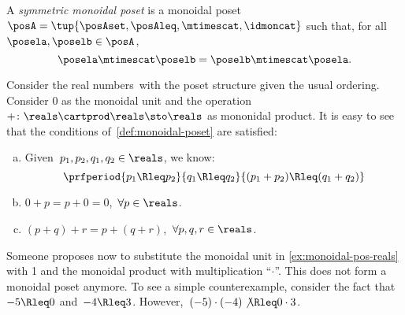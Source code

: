 \begin{ctdefinition}
    \label{def:sym-monoidal-poset}
    A \emph{symmetric monoidal poset} is a monoidal poset~$\posA=\tup{\posAset, \posAleq, \mtimescat, \idmoncat}$ such that, for all~$\posela, \poselb \in \posA$,
    \begin{equation}
        \posela \mtimescat \poselb = \poselb \mtimescat \posela.
    \end{equation}
\end{ctdefinition}

\begin{example}
    \label{ex:monoidal-pos-reals}
    Consider the real numbers~\reals with the poset structure given the usual ordering.
    Consider 0 as the monoidal unit and the operation~$+\colon \reals\cartprod \reals\sto \reals$ as mononidal product.
    It is easy to see that the conditions of~\cref{def:monoidal-poset} are satisfied:
    \begin{enumerate}[(a)]
        \item Given~$p_1,p_2,q_1,q_2\in \reals$, we know:
              \begin{equation*}
                  \prfperiod{
                      p_1\Rleq  p_2
                  }{
                      q_1\Rleq  q_2
                  }{
                      (p_1+p_2) \Rleq  (q_1+q_2)
                  }
              \end{equation*}
        \item $0+p=p+0=0$,~$\forall p\in \reals$.
        \item $(p+q)+r=p+(q+r)$,~$\forall p,q,r\in \reals$.
    \end{enumerate}
\end{example}

\begin{counterexample}
    Someone proposes now to substitute the monoidal unit in \cref{ex:monoidal-pos-reals} with 1 and the monoidal product with multiplication ``$\cdot$''.
    This does not form a monoidal poset anymore.
    To see a simple counterexample, consider the fact that~$-5\Rleq 0$ and~$-4\Rleq 3$.
    However,~$(-5)\cdot (-4) \not{\Rleq} 0 \cdot 3$.
\end{counterexample}

